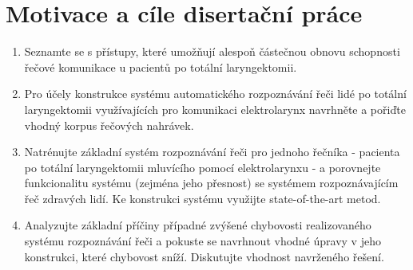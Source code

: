 \chapter{Motivace a cíle disertační práce}

\begin{enumerate}
  \item Seznamte se s přístupy, které umožňují alespoň částečnou obnovu schopnosti řečové komunikace u pacientů po totální laryngektomii.
  \item Pro účely konstrukce systému automatického rozpoznávání řeči lidé po totální laryngektomii využívajících pro komunikaci elektrolarynx navrhněte a pořiďte vhodný korpus řečových nahrávek.
  \item Natrénujte základní systém rozpoznávání řeči pro jednoho řečníka - pacienta po totální laryngektomii mluvícího pomocí elektrolarynxu - a porovnejte funkcionalitu systému (zejména jeho přesnost) se systémem rozpoznávajícím řeč zdravých lidí. Ke konstrukci systému využijte state-of-the-art metod.
  \item Analyzujte základní příčiny případné zvýšené chybovosti realizovaného systému rozpoznávání řeči a pokuste se navrhnout vhodné úpravy v jeho konstrukci, které chybovost sníží. Diskutujte vhodnost navrženého řešení.
\end{enumerate}
